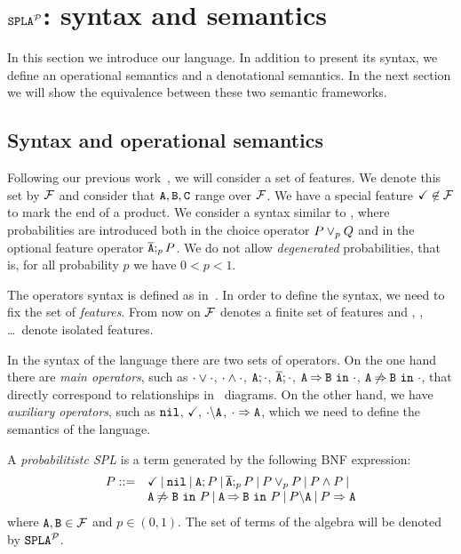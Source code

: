 \section{$\fodaPAp$: syntax and semantics}
\label{sec:stat:sintaxMain}
In this section we introduce our language. In addition to present its syntax, we define an operational semantics and a denotational semantics. In the next section we will show the equivalence between these two semantic frameworks.


\subsection{Syntax and operational semantics}
\label{sec:stat:sintax}
Following our previous work~\cite{acl13,clc16}, we will consider a
set of features. We denote this set by $\calF$ and consider that $\feature{A}, \feature{B},
\feature{C}$ range over $\calF$. We have a special feature
$\checkmark\not\in\calF$ to mark the end  of a product. We consider a syntax similar to
\fodaPA, where probabilities are introduced both in the choice operator $P \choice_{p} Q $ and in
the optional feature operator $\ofeature{A};_{p} P$. We do not allow
\emph{degenerated} probabilities, that is, for all probability $p$ we have $0< p<1$.

The operators syntax is defined as in~\cite{acl13,clc16}.
In order to define the syntax,
we need to fix the set of \emph{features}.
From now on $\calF$ denotes a finite set  of features
and  , , \dots\ denote isolated features.

In the syntax of the language there are two sets of operators.
On the one hand there are \emph{main operators}, such as $\cdot\choice\cdot$, $\cdot\paral\cdot$, $\feature{A};\cdot$, $\ofeature{A};\cdot$,
$\require{A}{B}{\cdot}$, $\exclude{A}{B}{\cdot}$,
that directly correspond to relationships in \FODA\ diagrams.
On the other hand, we have \emph{auxiliary operators}, such as $\nil$, $\checkmark$, $\forbid{A}{\cdot}$, $\mandatory{A}{\cdot}$,
which we need to define the semantics of the language.


\bdfn
\label{dfn:syntax}
A \emph{probabilitistc SPL} is a term generated by the following
BNF expression:
$$
\begin{array}{ll}
P::=& \checkmark \barra \nil \barra \feature{A};P \barra
\ofeature{A};_{p} P \barra P \choice_{p} P \barra P \paral P \barra
\\
& \exclude{A}{B}{P}\barra  \require{A}{B}{P}\barra  \forbid{A}{P}\barra  \mandatory{A}{P}\\
\end{array}
$$
\noindent
where $\feature{A},\feature{B} \in \calF$ and $p\in(0,1)$. The set of terms of the
algebra will be denoted by  $\fodaPAp$.
\edfn



